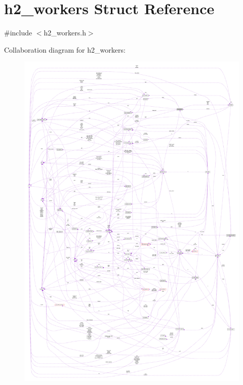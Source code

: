 \hypertarget{structh2__workers}{}\section{h2\+\_\+workers Struct Reference}
\label{structh2__workers}


{\ttfamily \#include $<$h2\+\_\+workers.\+h$>$}



Collaboration diagram for h2\+\_\+workers\+:
\nopagebreak
\begin{figure}[H]
\begin{center}
\leavevmode
\includegraphics[width=350pt]{structh2__workers__coll__graph}
\end{center}
\end{figure}
